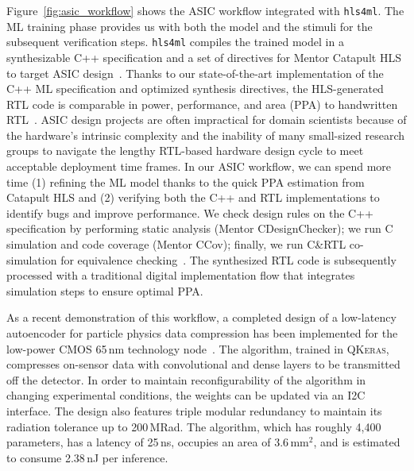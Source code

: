 \documentclass[tinyml]{acmart}
\newcommand{\hlsfml}{\texttt{hls4ml}\xspace}
\begin{document}
Figure~\ref{fig:asic_workflow} shows the ASIC workflow integrated with \hlsfml.
The ML training phase provides us with both the model and the stimuli for the subsequent verification steps.
\hlsfml compiles the trained model in a synthesizable \textsc{C++} specification and a set of directives for Mentor Catapult HLS to target ASIC design~\cite{catapulthls2020}.
Thanks to our state-of-the-art implementation of the \textsc{C++} ML specification and optimized synthesis directives, the HLS-generated RTL code is comparable in power, performance, and area (PPA) to handwritten RTL~\cite{khailany2018modular}.
ASIC design projects are often impractical for domain scientists because of the hardware's intrinsic complexity and the inability of many small-sized research groups to navigate the lengthy RTL-based hardware design cycle to meet acceptable deployment time frames.
In our ASIC workflow, we can spend more time (1) refining the ML model thanks to the quick PPA estimation from Catapult HLS and (2) verifying both the \textsc{C++} and RTL implementations to identify bugs and improve performance.
We check design rules on the \textsc{C++} specification by performing static analysis (Mentor CDesignChecker); we run \textsc{C} simulation and code coverage (Mentor CCov); finally, we run \textsc{C}\&RTL co-simulation for equivalence checking~\cite{hlsverific2020}.
The synthesized RTL code is subsequently processed with a traditional digital implementation flow that integrates simulation steps to ensure optimal PPA.

As a recent demonstration of this workflow, a completed design of a low-latency autoencoder for particle physics data compression has been implemented for the low-power CMOS 65\,nm technology node~\cite{ieee_nss_talk_1_2020,ieee_nss_talk_2_2020}.
The algorithm, trained in \textsc{QKeras}, compresses on-sensor data with convolutional and dense layers to be transmitted off the detector.
In order to maintain reconfigurability of the algorithm in changing experimental conditions, the weights can be updated via an I2C interface.
The design also features triple modular redundancy to maintain its radiation tolerance up to 200\,MRad.
The algorithm, which has roughly 4,400 parameters, has a latency of 25\,ns, occupies an area of 3.6\,mm$^2$, and is estimated to consume 2.38\,nJ per inference.

\end{document}
